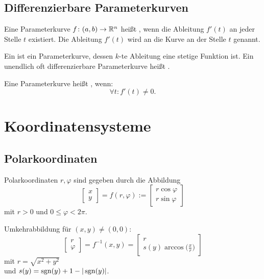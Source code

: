 \subsection{Differenzierbare Parameterkurven}

\begin{definition}
Eine Parameterkurve $f\colon (a,b)\to\mathbb R^n$ heißt
, wenn die Ableitung $f'(t)$ an jeder Stelle
$t$ existiert. Die Ableitung $f'(t)$ wird
 an die Kurve an der Stelle $t$ genannt.

Ein  ist ein Parameterkurve, dessen $k$-te Ableitung
eine stetige Funktion ist. Ein unendlich oft differenzierbare
Parameterkurve heißt .

Eine Parameterkurve heißt , wenn:
\begin{equation}
\forall t\colon f'(t)\ne 0.
\end{equation}
\end{definition}

\section{Koordinatensysteme}
\subsection{Polarkoordinaten}
Polarkoordinaten $r,\varphi$ sind gegeben durch
die Abbildung%
\begin{equation}
\begin{bmatrix}x\\ y\end{bmatrix}
=f(r,\varphi)
:=\begin{bmatrix}
r\cos\varphi\\
r\sin\varphi
\end{bmatrix}
\end{equation}
mit $r>0$ und $0\le\varphi<2\pi$.

Umkehrabbildung für $(x,y)\ne (0,0)$:
\begin{equation}
\begin{bmatrix}r\\ \varphi\end{bmatrix}
= f^{-1}(x,y)
= \begin{bmatrix}
r\\
\displaystyle s(y)\arccos\Big(\frac{x}{r}\Big)
\end{bmatrix}
\end{equation}
mit $r=\sqrt{x^2+y^2}$\\
und $s(y)=\operatorname*{sgn}(y)+1-|\operatorname*{sgn}(y)|$.


